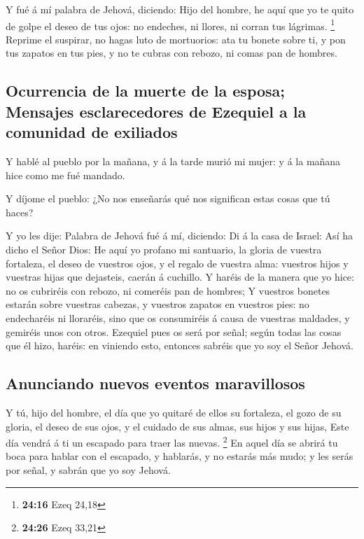  Y fué á mí palabra de Jehová, diciendo:  Hijo
del hombre, he aquí que yo te quito de golpe el deseo de tus ojos: no
endeches, ni llores, ni corran tus lágrimas. \footnote{\textbf{24:16}
  Ezeq 24,18}  Reprime el suspirar, no hagas luto de
mortuorios: ata tu bonete sobre ti, y pon tus zapatos en tus pies, y no
te cubras con rebozo, ni comas pan de hombres.

\hypertarget{ocurrencia-de-la-muerte-de-la-esposa-mensajes-esclarecedores-de-ezequiel-a-la-comunidad-de-exiliados}{%
\subsection{Ocurrencia de la muerte de la esposa; Mensajes
esclarecedores de Ezequiel a la comunidad de
exiliados}\label{ocurrencia-de-la-muerte-de-la-esposa-mensajes-esclarecedores-de-ezequiel-a-la-comunidad-de-exiliados}}

 Y hablé al pueblo por la mañana, y á la tarde murió mi
mujer: y á la mañana hice como me fué mandado.

 Y díjome el pueblo: ¿No nos enseñarás qué nos significan
estas cosas que tú haces?

 Y yo les dije: Palabra de Jehová fué á mí, diciendo:
 Di á la casa de Israel: Así ha dicho el Señor Dios: He
aquí yo profano mi santuario, la gloria de vuestra fortaleza, el deseo
de vuestros ojos, y el regalo de vuestra alma: vuestros hijos y vuestras
hijas que dejasteis, caerán á cuchillo.  Y haréis de la
manera que yo hice: no os cubriréis con rebozo, ni comeréis pan de
hombres;  Y vuestros bonetes estarán sobre vuestras
cabezas, y vuestros zapatos en vuestros pies: no endecharéis ni
lloraréis, sino que os consumiréis á causa de vuestras maldades, y
gemiréis unos con otros.  Ezequiel pues os será por señal;
según todas las cosas que él hizo, haréis: en viniendo esto, entonces
sabréis que yo soy el Señor Jehová.

\hypertarget{anunciando-nuevos-eventos-maravillosos}{%
\subsection{Anunciando nuevos eventos
maravillosos}\label{anunciando-nuevos-eventos-maravillosos}}

 Y tú, hijo del hombre, el día que yo quitaré de ellos su
fortaleza, el gozo de su gloria, el deseo de sus ojos, y el cuidado de
sus almas, sus hijos y sus hijas,  Este día vendrá á ti un
escapado para traer las nuevas. \footnote{\textbf{24:26} Ezeq 33,21}
 En aquel día se abrirá tu boca para hablar con el
escapado, y hablarás, y no estarás más mudo; y les serás por señal, y
sabrán que yo soy Jehová.

